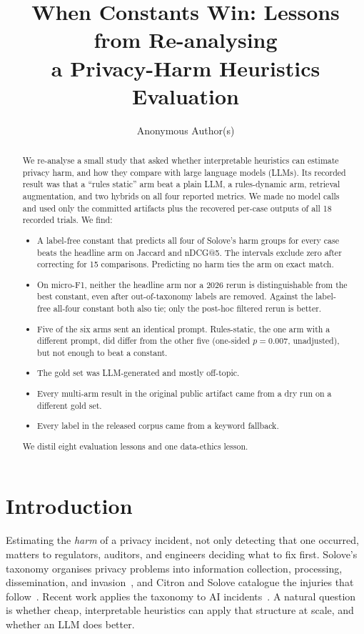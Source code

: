 \documentclass[10pt,twocolumn]{article}
\title{When Constants Win: Lessons from Re-analysing\\a Privacy-Harm Heuristics Evaluation}
\author{Anonymous Author(s)}
\date{}
\begin{document}
\maketitle

\begin{abstract}
We re-analyse a small study that asked whether interpretable heuristics can
estimate privacy harm, and how they compare with large language models (LLMs).
Its recorded result was that a ``rules static'' arm beat a plain LLM, a
rules-dynamic arm, retrieval augmentation, and two hybrids on all four reported
metrics. We made no model calls and used only the committed artifacts plus the
recovered per-case outputs of all 18 recorded trials. We find:
\begin{itemize}
  \item A label-free constant that predicts all four of Solove's harm groups
        for every case beats the headline arm on Jaccard and nDCG@5. The
        intervals exclude zero after correcting for 15 comparisons. Predicting
        no harm ties the arm on exact match.
  \item On micro-F1, neither the headline arm nor a 2026 rerun is
        distinguishable from the best constant, even after out-of-taxonomy
        labels are removed. Against the label-free all-four constant both
        also tie; only the post-hoc filtered rerun is better.
  \item Five of the six arms sent an identical prompt. Rules-static, the one
        arm with a different prompt, did differ from the other five (one-sided
        $p = 0.007$, unadjusted), but not enough to beat a constant.
  \item The gold set was LLM-generated and mostly off-topic.
  \item Every multi-arm result in the original public artifact came from a
        dry run on a different gold set.
  \item Every label in the released corpus came from a keyword fallback.
\end{itemize}
We distil eight evaluation lessons and one data-ethics lesson.
\end{abstract}

\section{Introduction}

Estimating the \emph{harm} of a privacy incident, not only detecting that one
occurred, matters to regulators, auditors, and engineers deciding what to fix
first. Solove's taxonomy organises privacy problems into information
collection, processing, dissemination, and invasion~\cite{solove2006}, and
Citron and Solove catalogue the injuries that follow~\cite{citron2022}. Recent
work applies the taxonomy to AI incidents~\cite{lee2024}. A natural question is
whether cheap, interpretable heuristics can apply that structure at scale, and
whether an LLM does better.
\end{document}
